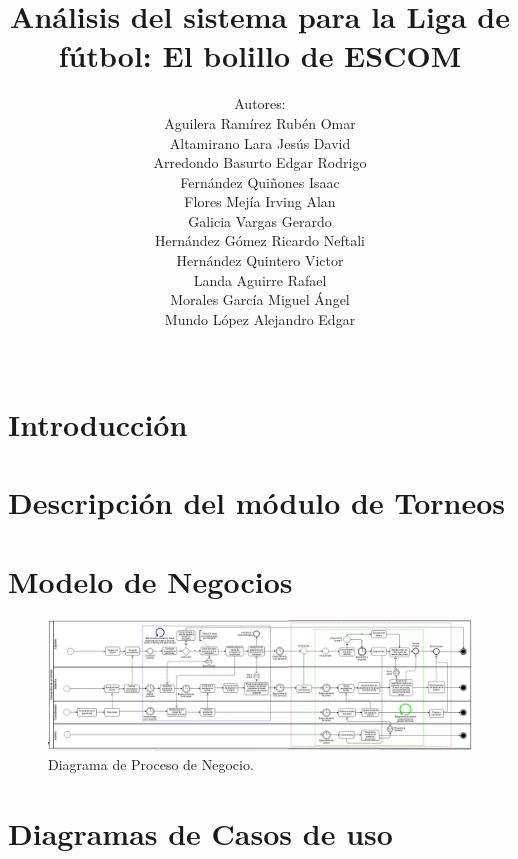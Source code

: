 \documentclass[oneside,10pt]{book}
\title{Análisis del sistema para la Liga de fútbol: El bolillo de ESCOM }
\subtitle{}
\author{Autores: \\Aguilera Ramírez Rubén Omar \\ Altamirano Lara Jesús David \\ Arredondo Basurto Edgar Rodrigo \\ Fernández Quiñones Isaac \\ Flores Mejía Irving Alan \\ Galicia Vargas Gerardo \\ Hernández Gómez Ricardo Neftali \\ Hernández Quintero Victor \\ Landa Aguirre Rafael\\ Morales García Miguel Ángel \\ Mundo López Alejandro Edgar \\ \\}
\begin{document}
\maketitle
\thispagestyle{empty}

\frontmatter
\tableofcontents

\mainmatter

\chapter{Introducción}


\chapter{Descripción del módulo de Torneos}


\chapter{Modelo de Negocios}
\begin{figure}[htbp!]
	\centering
		\includegraphics[width=.99\textwidth]{images/proceso}
	\caption{Diagrama de Proceso de Negocio.}
\end{figure}

\chapter{Diagramas de Casos de uso}
\end{document}

